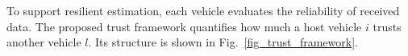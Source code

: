 \documentclass{ifacconf}
\def\eqref#1{(\ref{#1})}
\def\N{\mathcal{N}} %
\def\LO{\mathcal{LO}} %
\def\DO{\mathcal{DO}} %
\begin{document}
To support resilient estimation, each vehicle evaluates the reliability of received data.
The proposed trust framework quantifies how much a host vehicle $i$ trusts another vehicle $l$. Its structure is shown in Fig.~\ref{fig_trust_framework}.
\end{document}
